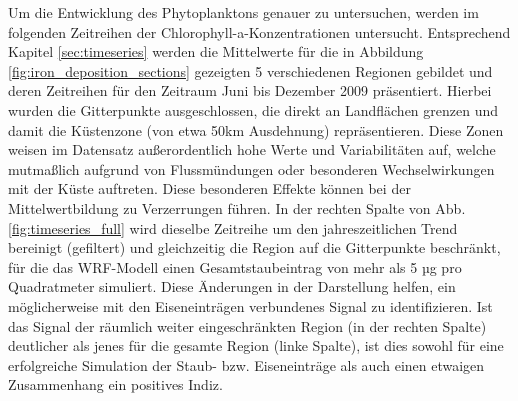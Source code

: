 \documentclass[12pt,a4paper,onecolumn]{scrartcl}
\begin{document}
Um die Entwicklung des Phytoplanktons genauer zu untersuchen, werden im folgenden Zeitreihen der Chlorophyll-a-Konzentrationen untersucht. Entsprechend Kapitel \ref{sec:timeseries} werden die Mittelwerte für die in Abbildung \ref{fig:iron_deposition_sections} gezeigten 5 verschiedenen Regionen gebildet und deren Zeitreihen für den Zeitraum Juni bis Dezember 2009 präsentiert. Hierbei wurden die Gitterpunkte ausgeschlossen, die direkt an Landflächen grenzen und damit die Küstenzone (von etwa 50km Ausdehnung) repräsentieren. Diese Zonen weisen im Datensatz außerordentlich hohe Werte und Variabilitäten auf, welche mutmaßlich aufgrund von Flussmündungen oder besonderen Wechselwirkungen mit der Küste auftreten. Diese besonderen Effekte können bei der Mittelwertbildung zu Verzerrungen führen. In der rechten Spalte von Abb. \ref{fig:timeseries_full} wird dieselbe Zeitreihe um den jahreszeitlichen Trend bereinigt (gefiltert) und gleichzeitig die Region auf die Gitterpunkte beschränkt, für die das WRF-Modell einen Gesamtstaubeintrag von mehr als 5 µg pro Quadratmeter simuliert. Diese Änderungen in der Darstellung helfen, ein möglicherweise mit den Eiseneinträgen verbundenes Signal zu identifizieren. Ist das Signal der räumlich weiter eingeschränkten Region (in der rechten Spalte) deutlicher als jenes für die gesamte Region (linke Spalte), ist dies sowohl für eine erfolgreiche Simulation der Staub- bzw. Eiseneinträge als auch einen etwaigen Zusammenhang ein positives Indiz. 
\end{document}
